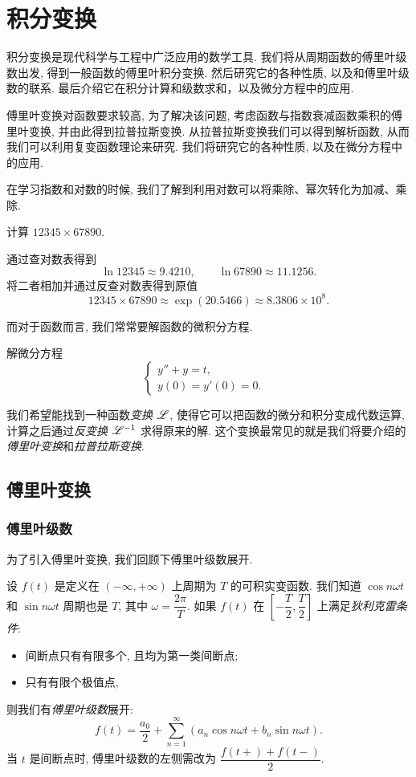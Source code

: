 \chapter{积分变换}
\label{chapter:6}

积分变换是现代科学与工程中广泛应用的数学工具.
我们将从周期函数的傅里叶级数出发, 得到一般函数的傅里叶积分变换.
然后研究它的各种性质, 以及和傅里叶级数的联系.
最后介绍它在积分计算和级数求和，以及微分方程中的应用.

傅里叶变换对函数要求较高, 为了解决该问题, 考虑函数与指数衰减函数乘积的傅里叶变换, 并由此得到拉普拉斯变换.
从拉普拉斯变换我们可以得到解析函数, 从而我们可以利用复变函数理论来研究.
我们将研究它的各种性质, 以及在微分方程中的应用.


在学习指数和对数的时候, 我们了解到利用对数可以将乘除、幂次转化为加减、乘除.
\begin{example}
	计算 $12345\times 67890$.
\end{example}
\begin{solution}
	通过查对数表得到
		\[\ln 12345\approx 9.4210,\qquad\ln 67890\approx 11.1256.\]%
	将二者相加并通过反查对数表得到原值
		\[12345\times 67890\approx \exp(20.5466)\approx 8.3806\times 10^8.\]
\end{solution}

而对于函数而言, 我们常常要解函数的微积分方程.
\begin{example}
	解微分方程
	\[\begin{cases}
		y''+y=t,&\\
		y(0)=y'(0)=0.&
	\end{cases}\]
\end{example}
\begin{solution}
		我们希望能找到一种函数\emph{变换 $\mathscr{L}$}, 使得它可以把函数的微分和积分变成代数运算, 计算之后通过\emph{反变换 $\mathscr{L}^{-1}$} 求得原来的解.
		这个变换最常见的就是我们将要介绍的\emph{傅里叶变换}和\emph{拉普拉斯变换}.
\end{solution}

\section{傅里叶变换}

\subsection{傅里叶级数}

为了引入傅里叶变换, 我们回顾下傅里叶级数展开.

设 $f(t)$ 是定义在 $(-\infty,+\infty)$ 上周期为 $T$ 的可积实变函数.
我们知道 $\cos n\omega t$ 和 $\sin n\omega t$ 周期也是 $T$, 其中 $\omega=\dfrac{2\pi}T$.
如果 $f(t)$ 在 $\left[-\dfrac T2,\dfrac T2\right]$ 上满足\emph{狄利克雷条件}:
\begin{itemize}
	\item 间断点只有有限多个, 且均为第一类间断点;
	\item 只有有限个极值点,
\end{itemize}
则我们有\emph{傅里叶级数}展开:
	\[f(t)=\frac{a_0}2+\sum_{n=1}^\infty \left(a_n\cos n\omega t+b_n \sin n\omega t\right).\]
当 $t$ 是间断点时, 傅里叶级数的左侧需改为 $\dfrac{f(t+)+f(t-)}2$.

